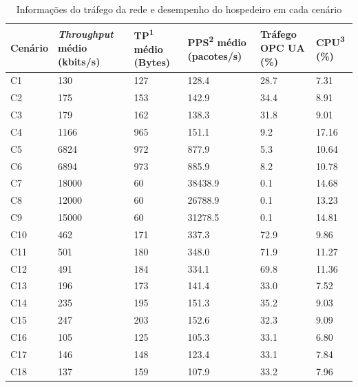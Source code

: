     \begin{table}[htbp!]
        \centering
        \caption{Informações do tráfego da rede e desempenho do hospedeiro em cada cenário}%
        \label{tab:carac-cenarios}
        \begin{tabular}{M{1.5cm}M{3cm}M{2.5cm}M{2.5cm}M{2cm}M{2cm}}
            \toprule
            \textbf{Cenário} & \textbf{\textit{Throughput} médio (kbits/s)} & \textbf{TP\textsuperscript{1} médio (Bytes)} & \textbf{PPS\textsuperscript{2} médio (pacotes/s)} & \textbf{Tráfego OPC UA (\%)} & \textbf{CPU\textsuperscript{3} (\%)} \\
            \toprule
            C1 & 130 & 127 & 128.4 & 28.7 & 7.31 \\
            \midrule
            C2 & 175 & 153 & 142.9 & 34.4 & 8.91 \\
            \midrule
            C3 & 179 & 162 & 138.3 & 31.8 & 9.01 \\
            \midrule
            C4 & 1166 & 965 & 151.1 & 9.2 & 17.16 \\
            \midrule
            C5 & 6824 & 972 & 877.9 & 5.3 & 10.64 \\
            \midrule
            C6 & 6894 & 973 & 885.9 & 8.2 & 10.78 \\
            \midrule
            C7 & 18000 & 60 & 38438.9 & 0.1 & 14.68 \\
            \midrule
            C8 & 12000 & 60 & 26788.9 & 0.1 & 13.23 \\
            \midrule
            C9 & 15000 & 60 & 31278.5 & 0.1 & 14.81 \\
            \midrule
            C10 & 462 & 171 & 337.3 & 72.9 & 9.86 \\
            \midrule
            C11 & 501 & 180 & 348.0 & 71.9 & 11.27 \\
            \midrule
            C12 & 491 & 184 & 334.1 & 69.8 & 11.36 \\
            \midrule
            C13 & 196 & 173 & 141.4 & 33.0 & 7.52 \\
            \midrule
            C14 & 235 & 195 & 151.3 & 35.2 & 9.03 \\
            \midrule
            C15 & 247 & 203 & 152.6 & 32.3 & 9.09 \\
            \midrule
            C16 & 105 & 125 & 105.3 & 33.1 & 6.80 \\
            \midrule
            C17 & 146 & 148 & 123.4 & 33.1 & 7.84 \\
            \midrule
            C18 & 137 & 159 & 107.9 & 33.2 & 7.96 \\

\end{tabular}
\end{table}
